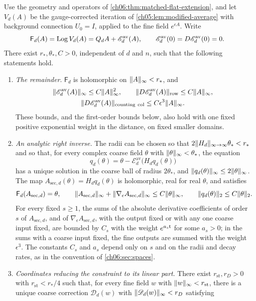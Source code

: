 \begin{theorem}\label{ch06:thm:nonlinear-section}
Use the geometry and operators of \cref{ch06:thm:matched-flat-extension}, and let $V_d(A)$ be the gauge-corrected iteration of \cref{ch05:lem:modified-average} with background connection $U_0=I$, applied to the fine field $e^{\epsilon A}$. Write
\[
 \mathsf F_d(A)=\operatorname{Log} V_d(A)=Q_dA+\mathscr E_d^{\mathrm{av}}(A),\qquad\mathscr E_d^{\mathrm{av}}(0)=D\mathscr E_d^{\mathrm{av}}(0)=0.
\]
There exist $r_*,\theta_*,C>0$, independent of $d$ and $n$, such that the following statements hold.
\begin{enumerate}
\item \emph{The remainder.} $\mathsf F_d$ is holomorphic on $\lVert A\rVert_\infty<r_*$, and
\[
 \begin{gathered}
 \lVert \mathscr E_d^{\mathrm{av}}(A)\rVert_\infty\le C\lVert A\rVert_\infty^2,\qquad\lVert D\mathscr E_d^{\mathrm{av}}(A)\rVert_{\mathrm{row}}\le C\lVert A\rVert_\infty,\\
 \lVert D\mathscr E_d^{\mathrm{av}}(A)\rVert_{\mathrm{counting\ col}}\le C\epsilon^3\lVert A\rVert_\infty.
 \end{gathered}
\]
These bounds, and the first-order bounds below, also hold with one fixed positive exponential weight in the distance, on fixed smaller domains.
\item \emph{An analytic right inverse.} The radii can be chosen so that $2\lVert H_d\rVert_{\infty\to\infty}\theta_*<r_*$ and so that, for every complex coarse field $\theta$ with $\lVert \theta\rVert_\infty<\theta_*$, the equation
\[
 q_d(\theta)=\theta-\mathscr E_d^{\mathrm{av}}\bigl(H_dq_d(\theta)\bigr)
\]
has a unique solution in the coarse ball of radius $2\theta_*$, and $\lVert q_d(\theta)\rVert_\infty\le2\lVert \theta\rVert_\infty$. The map $A_{\mathrm{sec},d}(\theta)=H_dq_d(\theta)$ is holomorphic, real for real $\theta$, and satisfies
\[
 \mathsf F_d(A_{\mathrm{sec},d})=\theta,\qquad\lVert A_{\mathrm{sec},d}\rVert_\infty+\lVert \nabla_\epsilon A_{\mathrm{sec},d}\rVert_\infty\le C\lVert \theta\rVert_\infty,\qquad\lVert q_d(\theta)\rVert_2\le C\lVert \theta\rVert_2.
\]
For every fixed $s\ge1$, the sums of the absolute derivative coefficients of order $s$ of $A_{\mathrm{sec},d}$, and of $\nabla_\epsilon A_{\mathrm{sec},d}$, with the output fixed or with any one coarse input fixed, are bounded by $C_s$ with the weight $e^{a_s\mathsf t}$ for some $a_s>0$; in the sums with a coarse input fixed, the fine outputs are summed with the weight $\epsilon^3$. The constants $C_s$ and $a_s$ depend only on $s$ and on the radii and decay rates, as in the convention of \cref{ch06:sec:spaces}.
\item \emph{Coordinates reducing the constraint to its linear part.} There exist $r_{\mathrm{st}},r_D>0$ with $r_{\mathrm{st}}<r_*/4$ such that, for every fine field $w$ with $\lVert w\rVert_\infty<r_{\mathrm{st}}$, there is a unique coarse correction $\mathscr D_d(w)$ with $\lVert \mathscr D_d(w)\rVert_\infty<r_D$ satisfying

\end{enumerate}
\end{theorem}
